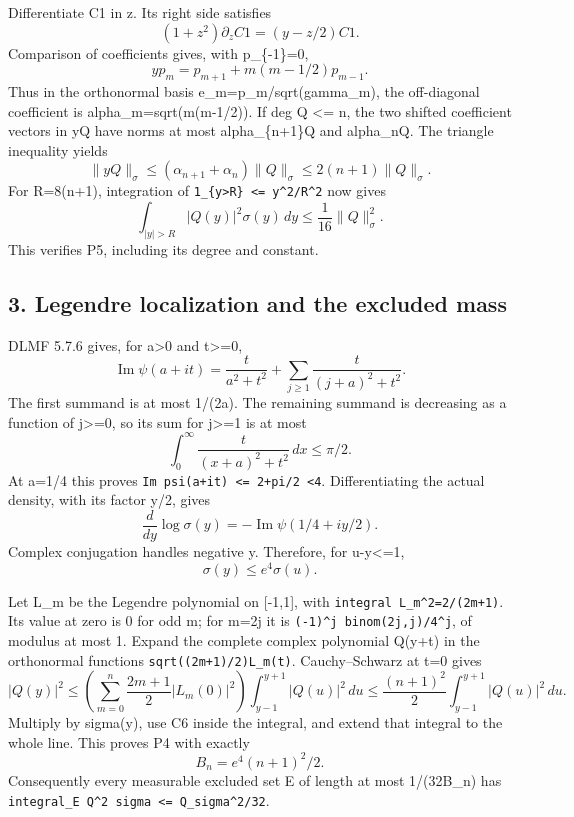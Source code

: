 \documentclass[11pt]{article}
\begin{document}
Differentiate C1 in z. Its right side satisfies \[
(1+z^2)\partial_z C1=(y-z/2)C1.
\] Comparison of coefficients gives, with p\_\{-1\}=0, \[
yp_m=p_{m+1}+m(m-1/2)p_{m-1}.
\tag{C3}
\] Thus in the orthonormal basis e\_m=p\_m/sqrt(gamma\_m), the off-diagonal coefficient is alpha\_m=sqrt(m(m-1/2)). If deg Q \textless= n, the two shifted coefficient vectors in yQ have norms at most alpha\_\{n+1\}\textbar\textbar Q\textbar\textbar{} and alpha\_n\textbar\textbar Q\textbar\textbar. The triangle inequality yields \[
\|yQ\|_\sigma\le(\alpha_{n+1}+\alpha_n)\|Q\|_\sigma
 \le2(n+1)\|Q\|_\sigma.
\tag{C4}
\] For R=8(n+1), integration of \texttt{1\_\{\textbar{}y\textbar{}\textgreater{}R\}\ \textless{}=\ y\^{}2/R\^{}2} now gives \[
\int_{|y|>R}|Q(y)|^2\sigma(y)\,dy\le\frac1{16}\|Q\|_\sigma^2.
\tag{C5}
\] This verifies P5, including its degree and constant.

\subsection{3. Legendre localization and the excluded mass}\label{legendre-localization-and-the-excluded-mass}

DLMF 5.7.6 gives, for a\textgreater0 and t\textgreater=0, \[
\operatorname{Im}\psi(a+it)=\frac{t}{a^2+t^2}
 +\sum_{j\ge1}\frac{t}{(j+a)^2+t^2}.
\] The first summand is at most 1/(2a). The remaining summand is decreasing as a function of j\textgreater=0, so its sum for j\textgreater=1 is at most \[
\int_0^\infty\frac{t}{(x+a)^2+t^2}\,dx\le\pi/2.
\] At a=1/4 this proves \texttt{\textbar{}Im\ psi(a+it)\textbar{}\ \textless{}=\ 2+pi/2\ \textless{}4}. Differentiating the actual density, with its factor y/2, gives \[
\frac d{dy}\log\sigma(y)=-\operatorname{Im}\psi(1/4+iy/2).
\] Complex conjugation handles negative y. Therefore, for \textbar u-y\textbar\textless=1, \[
\sigma(y)\le e^4\sigma(u).
\tag{C6}
\]

Let L\_m be the Legendre polynomial on {[}-1,1{]}, with \texttt{integral\ L\_m\^{}2=2/(2m+1)}. Its value at zero is 0 for odd m; for m=2j it is \texttt{(-1)\^{}j\ binom(2j,j)/4\^{}j}, of modulus at most 1. Expand the complete complex polynomial Q(y+t) in the orthonormal functions \texttt{sqrt((2m+1)/2)L\_m(t)}. Cauchy--Schwarz at t=0 gives \[
|Q(y)|^2\le
 \left(\sum_{m=0}^n\frac{2m+1}{2}|L_m(0)|^2\right)
 \int_{y-1}^{y+1}|Q(u)|^2\,du
\le\frac{(n+1)^2}{2}\int_{y-1}^{y+1}|Q(u)|^2\,du.
\] Multiply by sigma(y), use C6 inside the integral, and extend that integral to the whole line. This proves P4 with exactly \[
B_n=e^4(n+1)^2/2.
\tag{C7}
\] Consequently every measurable excluded set E of length at most 1/(32B\_n) has \texttt{integral\_E\ \textbar{}Q\textbar{}\^{}2\ sigma\ \textless{}=\ \textbar{}\textbar{}Q\textbar{}\textbar{}\_sigma\^{}2/32}.
\end{document}
